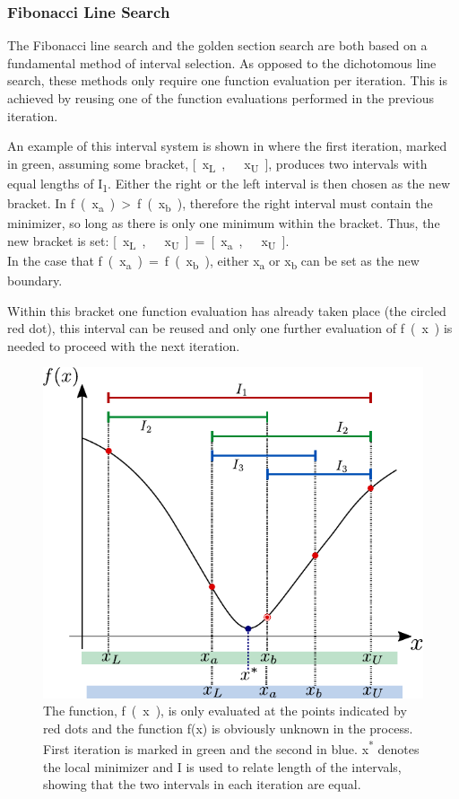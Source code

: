 \subsubsection{Fibonacci Line Search}The Fibonacci line search and the golden section search are both based on a fundamental method of interval selection. As opposed to the dichotomous line search, these methods only require one function evaluation per iteration. This is achieved by reusing one of the function evaluations performed in the previous iteration.\cite{AAntoniou}

An example of this interval system is shown in  where the first iteration, marked in green, assuming some bracket, \si{[x_{L},\ x_{U}]}, produces two intervals with equal lengths of \si{I_1}. Either the right or the left interval is then chosen as the new bracket. In  \si{f(x_a) > f(x_b)}, therefore the right interval must contain the minimizer, so long as there is only one minimum within the bracket. Thus, the new bracket is set: \si{[x_{L},\ x_{U}] = \si{[x_{a},\ x_{U}]}}.\\
In the case that \si{f(x_a) = f(x_b)}, either \si{x_a} or \si{x_b} can be set as the new boundary.

Within this bracket one function evaluation has already taken place (the circled red dot), this interval can be reused and only one further evaluation of \si{f(x)} is needed to proceed with the next iteration.

\begin{figure}[H] 
	\centering
	\includegraphics[width=.5\textwidth]{figures/fibonacciIntervalSystem}
	\caption{The function, \si{f(x)}, is only evaluated at the points indicated by red dots and the function f(x) is obviously unknown in the process. First iteration is marked in green and the second in blue. \si{x^*} denotes the local minimizer and \si{I} is used to relate length of the intervals, showing that the two intervals in each iteration are equal.}
	\label{fibonacciIntervalSystem}
\end{figure}

